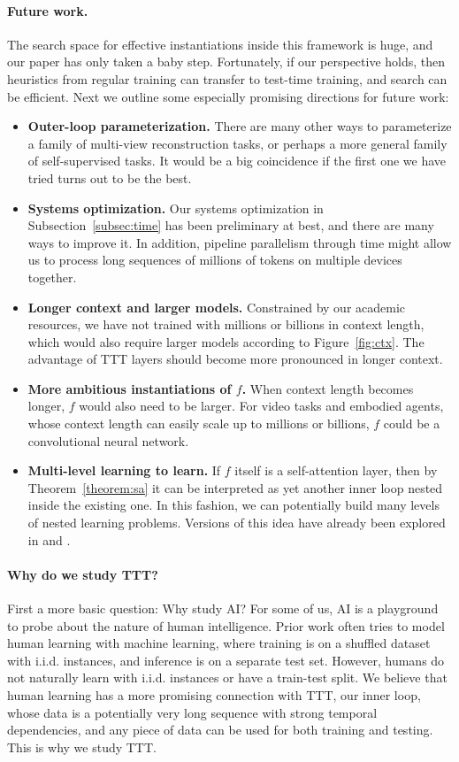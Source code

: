 \documentclass{article}
\begin{document}
\paragraph{Future work.}
The search space for effective instantiations inside this framework is huge, and our paper has only taken a baby step.
Fortunately, if our perspective holds, then heuristics from regular training can transfer to test-time training, and search can be efficient.
Next we outline some especially promising directions for future work:
\begin{itemize}[leftmargin=*]
\item \textbf{Outer-loop parameterization.}
There are many other ways to parameterize a family of multi-view reconstruction tasks, or perhaps a more general family of self-supervised tasks. It would be a big coincidence if the first one we have tried turns out to be the best.
\item \textbf{Systems optimization.} Our systems optimization in Subsection~\ref{subsec:time} has been preliminary at best, and there are many ways to improve it.
In addition, pipeline parallelism through time might allow us to process long sequences of millions of tokens on multiple devices together.
\item \textbf{Longer context and larger models.} Constrained by our academic resources, we have not trained with millions or billions in context length, which would also require larger models according to Figure~\ref{fig:ctx}.
The advantage of TTT layers should become more pronounced in longer context.
\item \textbf{More ambitious instantiations of $f$.}
When context length becomes longer, $f$ would also need to be larger. 
For video tasks and embodied agents, whose context length can easily scale up to millions or billions, $f$ could be a convolutional neural network.
\item \textbf{Multi-level learning to learn.} If $f$ itself is a self-attention layer, then by Theorem~\ref{theorem:sa} it can be interpreted as yet another inner loop nested inside the existing one. 
In this fashion, we can potentially build many levels of nested learning problems.
Versions of this idea have already been explored in \cite{irie2021going} and \cite{irie2022modern}.
\end{itemize}

\paragraph{Why do we study TTT?} First a more basic question: Why study AI? For some of us, AI is a playground to probe about the nature of human intelligence. 
Prior work often tries to model human learning with machine learning, where training is on a shuffled dataset with i.i.d. instances, and inference is on a separate test set. 
However, humans do not naturally learn with i.i.d. instances or have a train-test split.
We believe that human learning has a more promising connection with TTT, our inner loop, whose data is a potentially very long sequence with strong temporal dependencies, and any piece of data can be used for both training and testing. This is why we study TTT.
\end{document}
